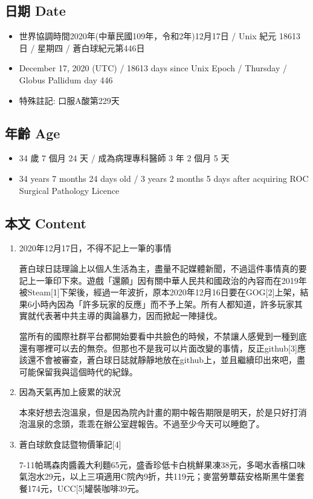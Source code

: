 \documentclass[a5paper, 10pt
]{book}
\providecommand{\tightlist}{%
  \setlength{\itemsep}{0pt}\setlength{\parskip}{0pt}}
\begin{document}
\hypertarget{ux65e5ux671f-date-16}{%
\subsection{日期 Date}\label{ux65e5ux671f-date-16}}

\begin{itemize}
\tightlist
\item
  世界協調時間2020年(中華民國109年，令和2年)12月17日 / Unix 紀元 18613
  日 / 星期四 / 蒼白球紀元第446日
\item
  December 17, 2020 (UTC) / 18613 days since Unix Epoch / Thursday /
  Globus Pallidum day 446
\item
  特殊註記: 口服A酸第229天
\end{itemize}

\hypertarget{ux5e74ux9f61-age-16}{%
\subsection{年齡 Age}\label{ux5e74ux9f61-age-16}}

\begin{itemize}
\tightlist
\item
  34 歲 7 個月 24 天 / 成為病理專科醫師 3 年 2 個月 5 天
\item
  34 years 7 months 24 days old / 3 years 2 months 5 days after
  acquiring ROC Surgical Pathology Licence
\end{itemize}

\hypertarget{ux672cux6587-content-16}{%
\subsection{本文 Content}\label{ux672cux6587-content-16}}

\begin{enumerate}
\def\labelenumi{\arabic{enumi}.}
\item
  2020年12月17日，不得不記上一筆的事情

  蒼白球日誌理論上以個人生活為主，盡量不記媒體新聞，不過這件事情真的要記上一筆印下來。遊戲「還願」因有關中華人民共和國政治的內容而在2019年被Steam{[}1{]}下架後，經過一年波折，原本2020年12月16日要在GOG{[}2{]}上架，結果6小時內因為「許多玩家的反應」而不予上架。所有人都知道，許多玩家其實就代表著中共主導的輿論暴力，因而掀起一陣撻伐。

  當所有的國際社群平台都開始要看中共臉色的時候，不禁讓人感覺到一種到底還有哪裡可以去的無奈。但那也不是我可以片面改變的事情，反正github{[}3{]}應該還不會被審查，蒼白球日誌就靜靜地放在github上，並且繼續印出來吧，盡可能保留我與這個時代的紀錄。
\item
  因為天氣再加上疲累的狀況

  本來好想去泡溫泉，但是因為院內計畫的期中報告期限是明天，於是只好打消泡溫泉的念頭，乖乖在辦公室趕報告。不過至少今天可以睡飽了。
\item
  蒼白球飲食誌暨物價筆記{[}4{]}

  7-11帕瑪森肉醬義大利麵65元，盛香珍低卡白桃鮮果凍38元，多喝水香檳口味氣泡水29元，以上三項適用C院內9折，共119元；麥當勞蕈菇安格斯黑牛堡套餐174元，UCC{[}5{]}罐裝咖啡39元。
\end{enumerate}
\end{document}
